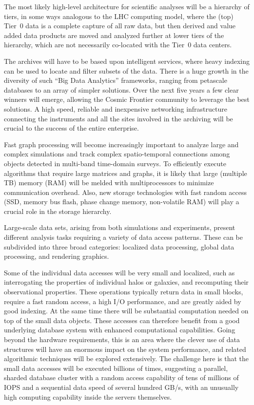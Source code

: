 The most likely high-level architecture for scientific analyses will
be a hierarchy of tiers, in some ways analogous to the LHC computing
model, where the (top) Tier~0 data is a complete capture of all raw data,
but then derived and value added data products are moved and analyzed
further at lower tiers of the hierarchy, which are not necessarily
co-located with the Tier~0 data centers.

The archives will have to be based upon intelligent services, where
heavy indexing can be used to locate and filter subsets of the
data. There is a huge growth in the diversity of such ``Big Data
Analytics'' frameworks, ranging from petascale databases to an array
of simpler solutions. Over the next five years a few clear winners
will emerge, allowing the Cosmic Frontier community to leverage the
best solutions. A high speed, reliable and inexpensive networking
infrastructure connecting the instruments and all the sites involved
in the archiving will be crucial to the success of the entire
enterprise.

Fast graph processing will become increasingly important to analyze
large and complex simulations and track complex spatio-temporal
connections among objects detected in multi-band time-domain
surveys. To efficiently execute algorithms that require large matrices
and graphs, it is likely that large (multiple TB) memory (RAM) will be
melded with multiprocessors to minimize communication overhead. Also,
new storage technologies with fast random access (SSD, memory bus
flash, phase change memory, non-volatile RAM) will play a crucial role
in the storage hierarchy.

Large-scale data sets, arising from both simulations and experiments,
present different analysis tasks requiring a variety of data access
patterns. These can be subdivided into three broad categories:
localized data processing, global data processing, and rendering
graphics.

Some of the individual data accesses will be very small and localized,
such as interrogating the properties of individual halos or galaxies, and
recomputing their observational properties. These operations typically
return data in small blocks, require a fast random access, a high I/O
performance, and are greatly aided by good indexing. At the same time
there will be substantial computation needed on top of the small data
objects. These accesses can therefore benefit from a good underlying
database system with enhanced computational capabilities. Going beyond
the hardware requirements, this is an area where the clever use of
data structures will have an enormous impact on the system
performance, and related algorithmic techniques will be explored
extensively. The challenge here is that the small data accesses will
be executed billions of times, suggesting a parallel, sharded database
cluster with a random access capability of tens of millions of IOPS
and a sequential data speed of several hundred GB/s, with an unusually
high computing capability inside the servers themselves.

